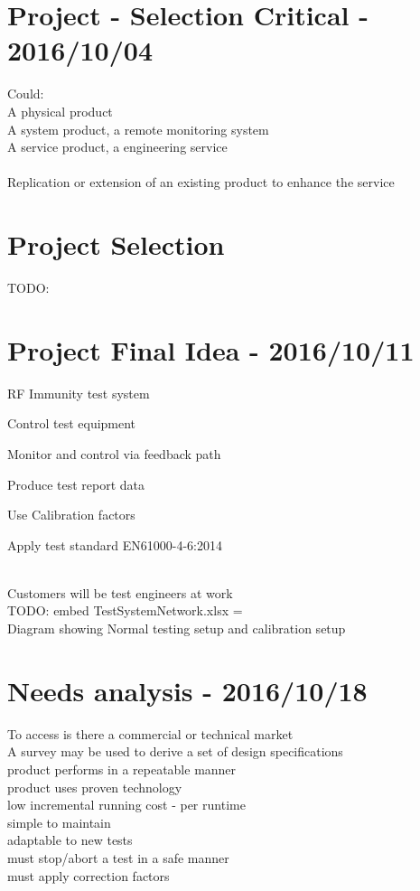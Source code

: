 \documentclass[a4paper]{article}
\begin{document}
\section{Project - Selection Critical - 2016/10/04}
Could:\\
A physical product\\
A system product, a remote monitoring system\\
A service product, a engineering service\\
\\
Replication or extension of an existing product to enhance the service\\

\section{Project Selection}
TODO:\\

\newpage

\section{Project Final Idea - 2016/10/11}
RF Immunity test system\\
\begin{itemize*}
  \item Control test equipment
  \item Monitor and control via feedback path
  \item Produce test report data
  \item Use Calibration factors
  \item Apply test standard EN61000-4-6:2014
\end{itemize*}\\
Customers will be test engineers at work\\
TODO: embed TestSystemNetwork.xlsx  = \\
Diagram showing Normal testing setup and calibration setup\\

\section{Needs analysis - 2016/10/18}
To access is there a commercial or technical market\\
A survey may be used to derive a set of design specifications\\
product performs in a repeatable manner\\
product uses proven technology\\
low incremental running cost - per runtime\\
simple to maintain\\
adaptable to new tests\\
must stop/abort a test in a safe manner\\
must apply correction factors\\
\end{document}
